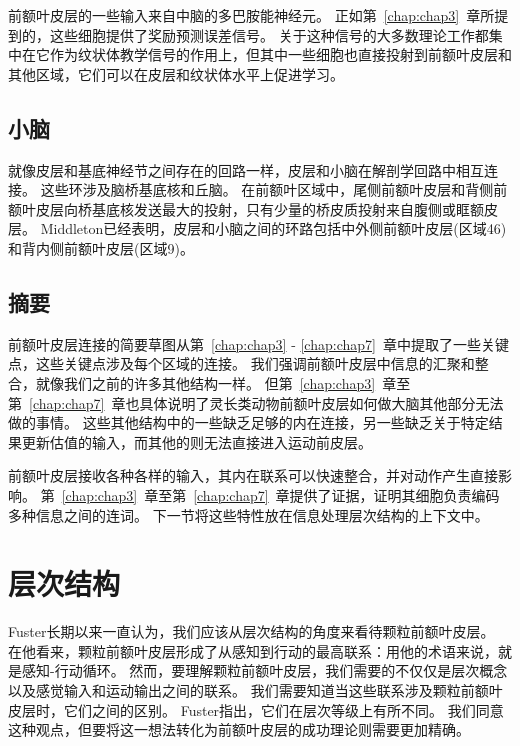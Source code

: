 前额叶皮层的一些输入来自中脑的多巴胺能神经元。
正如第~\ref{chap:chap3}~章所提到的，这些细胞提供了奖励预测误差信号\cite{schultz1998predictive}。
关于这种信号的大多数理论工作都集中在它作为纹状体教学信号的作用上，但其中一些细胞也直接投射到前额叶皮层和其他区域\cite{gaspar1992topography}，它们可以在皮层和纹状体水平上促进学习\cite{miller2007rules}。



\subsection{小脑}
\par

就像皮层和基底神经节之间存在的回路一样，皮层和小脑在解剖学回路中相互连接。
这些环涉及脑桥基底核和丘脑\cite{houk1995distributed}。
在前额叶区域中，尾侧前额叶皮层和背侧前额叶皮层向桥基底核发送最大的投射，只有少量的桥皮质投射来自腹侧或眶额皮层\cite{schmahmann1997anatomic,glickstein2008cerebellum}。
Middleton\cite{middleton1998cerebellar,middleton2001cerebellar}已经表明，皮层和小脑之间的环路包括中外侧前额叶皮层(区域46)和背内侧前额叶皮层(区域9)。



\subsection{摘要}
\par

前额叶皮层连接的简要草图从第~\ref{chap:chap3} - \ref{chap:chap7}~章中提取了一些关键点，这些关键点涉及每个区域的连接。
我们强调前额叶皮层中信息的汇聚和整合，就像我们之前的许多其他结构一样。
但第~\ref{chap:chap3}~章至第~\ref{chap:chap7}~章也具体说明了灵长类动物前额叶皮层如何做大脑其他部分无法做的事情。
这些其他结构中的一些缺乏足够的内在连接，另一些缺乏关于特定结果更新估值的输入，而其他的则无法直接进入运动前皮层。
\par


前额叶皮层接收各种各样的输入，其内在联系可以快速整合，并对动作产生直接影响。
第~\ref{chap:chap3}~章至第~\ref{chap:chap7}~章提供了证据，证明其细胞负责编码多种信息之间的连词。
下一节将这些特性放在信息处理层次结构的上下文中。



\section{层次结构}
\par

Fuster\cite{fuster2000executive}长期以来一直认为，我们应该从层次结构的角度来看待颗粒前额叶皮层。
在他看来，颗粒前额叶皮层形成了从感知到行动的最高联系：用他的术语来说，就是感知-行动循环。
然而，要理解颗粒前额叶皮层，我们需要的不仅仅是层次概念以及感觉输入和运动输出之间的联系。
我们需要知道当这些联系涉及颗粒前额叶皮层时，它们之间的区别。
Fuster指出，它们在层次等级上有所不同。
我们同意这种观点，但要将这一想法转化为前额叶皮层的成功理论则需要更加精确。
\par


